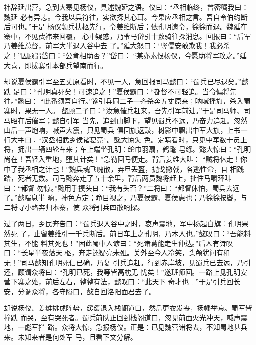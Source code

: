 祎辞延出营，急到大寨见杨仪，具述魏延之语。仪曰：“丞相临终，曾密嘱我曰：魏延
必有异志。今我以兵符往，实欲探其心耳。今果应丞相之言。吾自令伯约断后可也。”于是
杨仪领兵扶柩先行，令姜维断后；依孔明遗令，徐徐而退。魏延在寨中，不见费祎来回覆，
心中疑惑，乃令马岱引十数骑往探消息。回报曰：“后军乃姜维总督，前军大半退入谷中去
了。”延大怒曰：“竖儒安敢欺我！我必杀之！”因顾谓岱曰：“公肯相助否？”岱曰：
“某亦素恨杨仪，今愿助将军攻之。”延大喜，即拔寨引本部兵望南而行。

却说夏侯霸引军至五丈原看时，不见一人，急回报司马懿曰：“蜀兵已尽退矣。”懿跌
足曰：“孔明真死矣！可速追之！”夏侯霸曰：“都督不可轻追。当令偏将先往。”懿曰：
“此番须吾自行。”遂引兵同二子一齐杀奔五丈原来；呐喊摇旗，杀入蜀寨时，果无一人。
懿顾二子曰：“汝急催兵赶来，吾先引军前进。”于是司马师、司马昭在后催军；懿自引军
当先，追到山脚下，望见蜀兵不远，乃奋力追赶。忽然山后一声炮响，喊声大震，只见蜀兵
俱回旗返鼓，树影中飘出中军大旗，上书一行大字曰：“汉丞相武乡侯诸葛亮”。懿大惊失
色。定睛看时，只见中军数十员上将，拥出一辆四轮车来；车上端坐孔明：纶巾羽扇，鹤氅
皂绦。懿大惊曰：“孔明尚在！吾轻入重地，堕其计矣！”急勒回马便走。背后姜维大叫：
“贼将休走！你中了我丞相之计也！”魏兵魂飞魄散，弃甲丢盔，抛戈撇戟，各逃性命，自
相践踏，死者无数。司马懿奔走了五十余里，背后两员魏将赶上，扯住马嚼环叫曰：“都督
勿惊。”懿用手摸头曰：“我有头否？”二将曰：“都督休怕，蜀兵去远了。”懿喘息半
晌，神色方定；睁目视之，乃夏侯霸、夏侯惠也；乃徐徐按辔，与二将寻小路奔归本寨，使
众将引兵四散哨探。

过了两日，乡民奔告曰：“蜀兵退入谷中之时，哀声震地，军中扬起白旗：孔明果然死
了，止留姜维引一千兵断后。前日车上之孔明，乃木人也。”懿叹曰：“吾能料其生，不能
料其死也！”因此蜀中人谚曰：“死诸葛能走生仲达。”后人有诗叹曰：“长星半夜落天
枢，奔走还疑亮未殂。关外至今人冷笑，头颅犹问有和无！”司马懿知孔明死信已确，乃复
引兵追赶。行到赤岸坡，见蜀兵已去远，乃引还，顾谓众将曰：“孔明已死，我等皆高枕无
忧矣！”遂班师回。一路上见孔明安营下寨之处，前后左右，整整有法，懿叹曰：“此天下
奇才也！”于是引兵回长安，分调众将，各守隘口，懿自回洛阳面君去了。

却说杨仪、姜维排成阵势，缓缓退入栈阁道口，然后更衣发丧，扬幡举哀。蜀军皆撞跌
而哭，至有哭死者。蜀兵前队正回到栈阁道口，忽见前面火光冲天，喊声震地，一彪军拦
路。众将大惊，急报杨仪。正是：已见魏营诸将去，不知蜀地甚兵来。未知来者是何处军
马，且看下文分解。